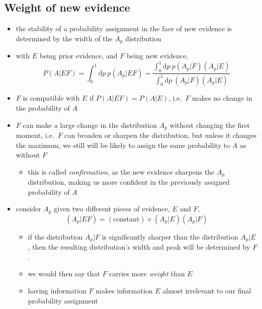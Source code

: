 \documentclass[../jaynes_prob_theory_notes.tex]{subfiles}
\begin{document}
            \subsection{Weight of new evidence}
                \begin{itemize} 
                    \item the stability of a probability assignment in the face of new evidence is determined by the width of the \(A_p\) distribution
                    \item with \(E\) being prior evidence, and \(F\) being new evidence,
                        \begin{equation*} 
                            P(A|EF) = \int^{1}_{0}\text{d}p~p(A_p|EF) = \frac{\int^{1}_{0}\text{d}p~p(A_p|F)(A_p|E)}{\int^{1}_{0}\text{d}p~(A_p|F)(A_p|E)}
                        \end{equation*}
                    \item \(F\) is compatible with \(E\) if \(P(A|EF) = P(A|E)\), i.e.\ \(F\) makes no change in the probability of \(A\)
                    \item \(F\) can make a large change in the distribution \(A_p\) without changing the first moment, i.e.\ \(F\) can broaden or sharpen the distribution, but unless it changes the maximum, we still will be likely to assign the same probability to \(A\) as without \(F\)
                        \begin{itemize} 
                            \item this is called \textit{confirmation}, as the new evidence sharpens the \(A_p\) distribution, making us more confident in the previously assigned probability of \(A\)
                        \end{itemize}
                    \item consider \(A_p\) given two different pieces of evidence, \(E\) and \(F\),
                        \begin{equation*} 
                            (A_p | EF) = (\text{constant}) \times (A_p|E)(A_p|F)
                        \end{equation*}
                        \begin{itemize} 
                            \item if the distribution \(A_p|F\) is significantly sharper than the distribution \(A_p|E\), then the resulting distribution's width and peak will be determined by \(F\).
                            \item we would then say that \(F\) carries more \textit{weight} than \(E\)
                            \item having information \(F\) makes information \(E\) almost irrelevant to our final probability assignment
                        \end{itemize}
                \end{itemize}
\end{document}
